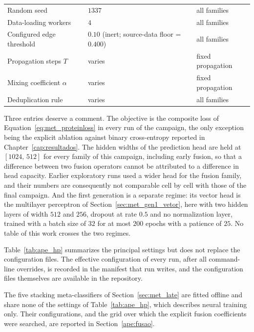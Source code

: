 \documentclass[Ingles]{ic-tese-v3}
\begin{document}
\begin{appendices}{}
\begin{table}[!htb]
\begin{tabular}{lll}
    Random seed                   & $1337$                      & all families \\
    Data-loading workers          & $4$                         & all families \\
    Configured edge threshold                & $0.10$ (inert; source-data floor = $0.400$)                       & all families \\
    Propagation steps $T$         & varies                      & fixed propagation \\
    Mixing coefficient $\alpha$   & varies                      & fixed propagation \\
    Deduplication rule            & varies                      & all families \\
    \hline
  \end{tabular}
\end{table}

Three entries deserve a comment. The objective is the composite loss of
Equation~\eqref{eq:met_proteinloss} in every run of the campaign, the only exception being the
explicit ablation against binary cross-entropy reported in Chapter~\ref{cap:resultados}. The hidden
widths of the prediction head are held at $[1024,\,512]$
for every family of this campaign, including early fusion, so that a difference between two fusion
operators cannot be attributed to a difference in head capacity. Earlier exploratory runs used a
wider head for the fusion family, and their numbers are consequently not comparable cell by cell
with those of the final campaign. And the first generation is a separate regime: its vector head is
the multilayer perceptron of Section~\ref{sec:met_gen1_vetor}, here with two hidden layers of
width $512$ and $256$, dropout at rate $0.5$ and no normalization layer, trained with a batch size
of $32$ for at most $200$ epochs with a patience of $25$. No table of this work crosses the two
regimes.


Table~\ref{tab:ape_hp} summarizes the principal settings but does not replace the configuration
files. The effective configuration of every run, after all command-line overrides, is recorded in
the manifest that run writes, and the configuration files themselves are available in the
repository.

The five stacking meta-classifiers of Section~\ref{sec:met_late} are fitted offline and share none
of the settings of Table~\ref{tab:ape_hp}, which describes neural training only. Their
configurations, and the grid over which the explicit fusion coefficients were searched, are reported
in Section~\ref{ape:fusao}.


\end{appendices}
\end{document}
